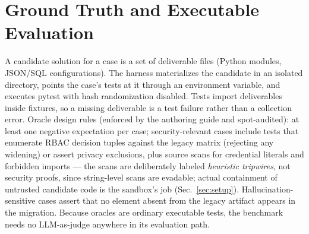 \documentclass{ieeetj}
\begin{document}
\section{Ground Truth and Executable Evaluation}
\label{sec:oracles}
A candidate solution for a case is a set of deliverable files (Python modules, JSON/SQL
configurations). The harness materializes the candidate in an isolated directory, points the
case's tests at it through an environment variable, and executes pytest with hash
randomization disabled. Tests import deliverables inside fixtures, so a missing deliverable is
a test failure rather than a collection error. Oracle design rules (enforced by the authoring
guide and spot-audited): at least one negative expectation per case; security-relevant cases
include tests that enumerate RBAC decision tuples against the legacy matrix (rejecting any
widening) or assert privacy exclusions, plus source scans for credential literals and
forbidden imports --- the scans are deliberately labeled \emph{heuristic tripwires}, not
security proofs, since string-level scans are evadable; actual containment of untrusted
candidate code is the sandbox's job (Sec.~\ref{sec:setup}). Hallucination-sensitive cases
assert that no element absent from the legacy artifact appears in the migration. Because
oracles are ordinary executable tests, the benchmark needs no LLM-as-judge anywhere in its
evaluation path.
\end{document}
